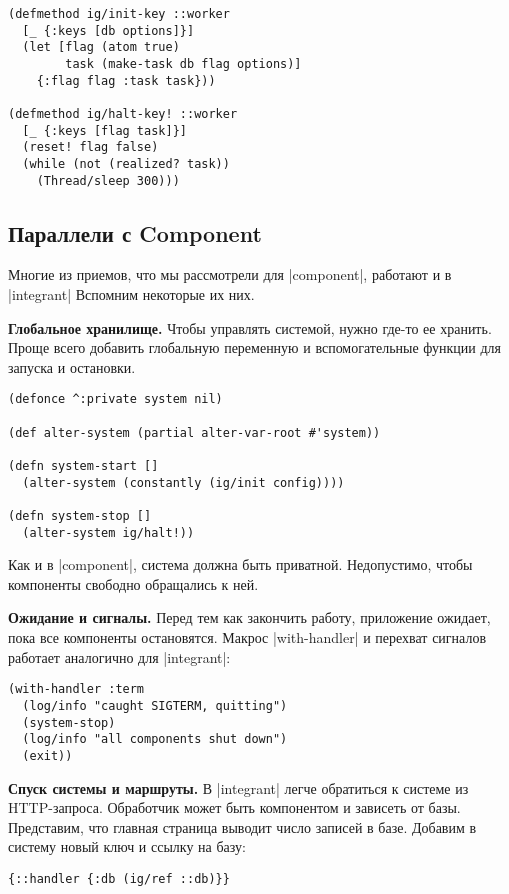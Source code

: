 \begin{verbatim}
(defmethod ig/init-key ::worker
  [_ {:keys [db options]}]
  (let [flag (atom true)
        task (make-task db flag options)]
    {:flag flag :task task}))

(defmethod ig/halt-key! ::worker
  [_ {:keys [flag task]}]
  (reset! flag false)
  (while (not (realized? task))
    (Thread/sleep 300)))
\end{verbatim}

\subsection{Параллели с Component}

Многие из приемов, что мы рассмотрели для \spverb|component|, работают и в
\spverb|integrant| Вспомним некоторые их них.

\textbf{Глобальное хранилище.} Чтобы управлять системой, нужно где-то ее
хранить. Проще всего добавить глобальную переменную и вспомогательные функции
для запуска и остановки.

\begin{verbatim}
(defonce ^:private system nil)

(def alter-system (partial alter-var-root #'system))

(defn system-start []
  (alter-system (constantly (ig/init config))))

(defn system-stop []
  (alter-system ig/halt!))
\end{verbatim}

Как и в \spverb|component|, система должна быть приватной. Недопустимо, чтобы
компоненты свободно обращались к ней.

\textbf{Ожидание и сигналы.} Перед тем как закончить работу, приложение ожидает,
пока все компоненты остановятся. Макрос \spverb|with-handler| и перехват
сигналов работает аналогично для \spverb|integrant|:

\begin{verbatim}
(with-handler :term
  (log/info "caught SIGTERM, quitting")
  (system-stop)
  (log/info "all components shut down")
  (exit))
\end{verbatim}

\textbf{Спуск системы и маршруты.} В \spverb|integrant| легче обратиться к
системе из HTTP-запроса. Обработчик может быть компонентом и зависеть от базы.
Представим, что главная страница выводит число записей в базе. Добавим в систему
новый ключ и ссылку на базу:

\begin{verbatim}
{::handler {:db (ig/ref ::db)}}
\end{verbatim}

